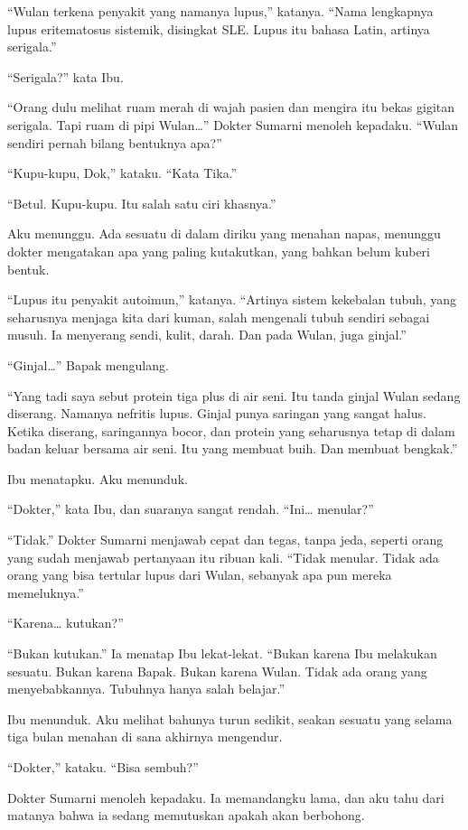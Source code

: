 \documentclass[11pt,twoside,openany]{book}
\begin{document}
``Wulan terkena penyakit yang namanya lupus,'' katanya. ``Nama lengkapnya lupus eritematosus sistemik, disingkat SLE. Lupus itu bahasa Latin, artinya serigala.''

``Serigala?'' kata Ibu.

``Orang dulu melihat ruam merah di wajah pasien dan mengira itu bekas gigitan serigala. Tapi ruam di pipi Wulan\ldots{}'' Dokter Sumarni menoleh kepadaku. ``Wulan sendiri pernah bilang bentuknya apa?''

``Kupu-kupu, Dok,'' kataku. ``Kata Tika.''

``Betul. Kupu-kupu. Itu salah satu ciri khasnya.''

Aku menunggu. Ada sesuatu di dalam diriku yang menahan napas, menunggu dokter mengatakan apa yang paling kutakutkan, yang bahkan belum kuberi bentuk.

``Lupus itu penyakit autoimun,'' katanya. ``Artinya sistem kekebalan tubuh, yang seharusnya menjaga kita dari kuman, salah mengenali tubuh sendiri sebagai musuh. Ia menyerang sendi, kulit, darah. Dan pada Wulan, juga ginjal.''

``Ginjal\ldots{}'' Bapak mengulang.

``Yang tadi saya sebut protein tiga plus di air seni. Itu tanda ginjal Wulan sedang diserang. Namanya nefritis lupus. Ginjal punya saringan yang sangat halus. Ketika diserang, saringannya bocor, dan protein yang seharusnya tetap di dalam badan keluar bersama air seni. Itu yang membuat buih. Dan membuat bengkak.''

Ibu menatapku. Aku menunduk.

``Dokter,'' kata Ibu, dan suaranya sangat rendah. ``Ini\ldots{} menular?''

``Tidak.'' Dokter Sumarni menjawab cepat dan tegas, tanpa jeda, seperti orang yang sudah menjawab pertanyaan itu ribuan kali. ``Tidak menular. Tidak ada orang yang bisa tertular lupus dari Wulan, sebanyak apa pun mereka memeluknya.''

``Karena\ldots{} kutukan?''

``Bukan kutukan.'' Ia menatap Ibu lekat-lekat. ``Bukan karena Ibu melakukan sesuatu. Bukan karena Bapak. Bukan karena Wulan. Tidak ada orang yang menyebabkannya. Tubuhnya hanya salah belajar.''

Ibu menunduk. Aku melihat bahunya turun sedikit, seakan sesuatu yang selama tiga bulan menahan di sana akhirnya mengendur.

``Dokter,'' kataku. ``Bisa sembuh?''

Dokter Sumarni menoleh kepadaku. Ia memandangku lama, dan aku tahu dari matanya bahwa ia sedang memutuskan apakah akan berbohong.
\end{document}
